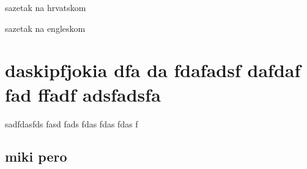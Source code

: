 \documentclass[zavrsni, alter]{FSBtex}
\begin{document}
\titlepage



\begin{AbstractHR}
sazetak na hrvatskom
\end{AbstractHR}

\begin{AbstractEN}
sazetak na engleskom
\end{AbstractEN}

\PageNumberingArabic
\newpage
\chapter{daskipfjokia dfa da fdafadsf dafdaf fad ffadf adsfadsfa}
sadfdasfds fasd fads fdas fdas fdas f
\section{miki pero}
\end{document}
